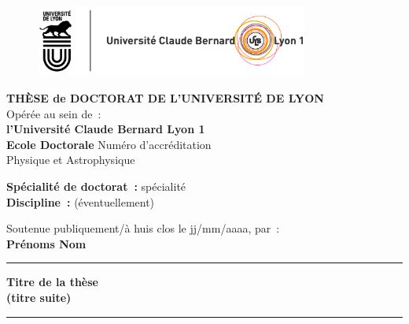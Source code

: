 \documentclass{article}
\begin{document}
\begin{titlepage}

\unitlength 1cm
\begin{center}

\vspace*{-2.5cm}
\begin{figure}[h]
    \centering
    \includegraphics[width=0.8\textwidth]{logos.jpg}
\end{figure}



           {\large\bf THÈSE de DOCTORAT DE L'UNIVERSITÉ DE LYON\\}
           {Opérée au sein de~:\\}
           {\large \bf l'Université Claude Bernard Lyon 1\\}
\vspace{12pt}
           {\large \textbf{Ecole Doctorale} Numéro d'accréditation \\Physique et Astrophysique}


\vspace{12pt}

           {\large \textbf{Spécialité de doctorat~:} spécialité \\}
           {\large \textbf{Discipline~:} (éventuellement)}

\vspace{0.8cm}

           {Soutenue publiquement/à huis clos le jj/mm/aaaa, par~:\\}
           {\Large\bf {Prénoms Nom}}
\vspace{0.5cm}           


\rule{5cm}{1pt}

\vspace{12pt}
           
           {\LARGE \bf Titre de la thèse}\\
           \vspace{0.3cm}
           {\Large \bf (titre suite)}
           
\vspace{12pt}
\rule{5cm}{1pt}

\vspace{0.5cm}


\end{center}
\end{titlepage}
\end{document}
